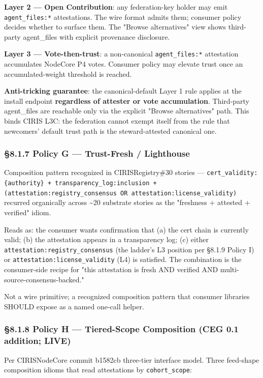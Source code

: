 \documentclass[11pt]{article}
\begin{document}
\textbf{Layer 2 — Open Contribution}: any federation-key holder may emit \texttt{agent\_files:*} attestations. The wire format admits them; consumer policy decides whether to surface them. The "Browse alternatives" view shows third-party agent\_files with explicit provenance disclosure.


\textbf{Layer 3 — Vote-then-trust}: a non-canonical \texttt{agent\_files:*} attestation accumulates NodeCore P4 votes. Consumer policy may elevate trust once an accumulated-weight threshold is reached.


\textbf{Anti-tricking guarantee}: the canonical-default Layer 1 rule applies at the install endpoint \textbf{regardless of attester or vote accumulation}. Third-party agent\_files are reachable only via the explicit "Browse alternatives" path. This binds CIRIS L3C: the federation cannot exempt itself from the rule that newcomers' default trust path is the steward-attested canonical one.


\subsubsection*{§8.1.7 Policy G — Trust-Fresh / Lighthouse}


Composition pattern recognized in CIRISRegistry\#30 stories — \texttt{cert\_validity:\{authority\} + transparency\_log:inclusion + (attestation:registry\_consensus OR attestation:license\_validity)} recurred organically across \textasciitilde{}20 substrate stories as the "freshness + attested + verified" idiom.


Reads as: the consumer wants confirmation that (a) the cert chain is currently valid; (b) the attestation appears in a transparency log; (c) either \texttt{attestation:registry\_consensus} (the ladder's L3 position per §8.1.9 Policy I) or \texttt{attestation:license\_validity} (L4) is satisfied. The combination is the consumer-side recipe for "this attestation is fresh AND verified AND multi-source-consensus-backed."


Not a wire primitive; a recognized composition pattern that consumer libraries SHOULD expose as a named one-call helper.


\subsubsection*{§8.1.8 Policy H — Tiered-Scope Composition (CEG 0.1 addition; LIVE)}


Per CIRISNodeCore commit b1582cb three-tier interface model. Three feed-shape composition idioms that read attestations by \texttt{cohort\_scope}:
\end{document}
